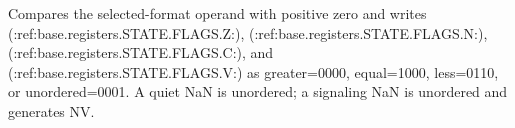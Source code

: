 Compares the selected-format operand with positive zero and writes (:ref:base.registers.STATE.FLAGS.Z:), (:ref:base.registers.STATE.FLAGS.N:), (:ref:base.registers.STATE.FLAGS.C:), and (:ref:base.registers.STATE.FLAGS.V:) as greater=0000, equal=1000, less=0110, or unordered=0001. A quiet NaN is unordered; a signaling NaN is unordered and generates NV.
